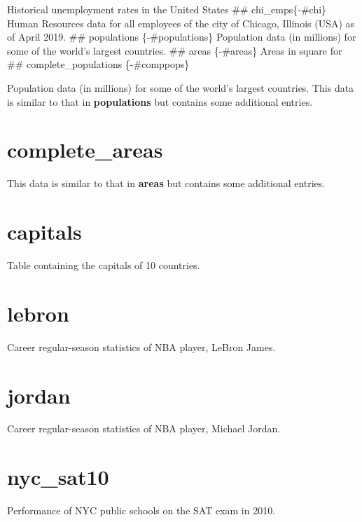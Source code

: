\documentclass[]{book}
\begin{document}
Historical unemployment rates in the United States
\#\# chi\_emps\{-\#chi\}
Human Resources data for all employees of the city of Chicago, Illinois (USA) as of April 2019.
\#\# populations \{-\#populations\}
Population data (in millions) for some of the world's largest countries.
\#\# areas \{-\#areas\}
Areas in square for
\#\# complete\_populations \{-\#comppops\}

Population data (in millions) for some of the world's largest countries. This data is similar to that in \textbf{populations} but contains some additional entries.

\hypertarget{compareas}{%
\section*{complete\_areas}\label{compareas}}

This data is similar to that in \textbf{areas} but contains some additional entries.

\hypertarget{capitals}{%
\section*{capitals}\label{capitals}}

Table containing the capitals of 10 countries.

\hypertarget{lebron}{%
\section*{lebron}\label{lebron}}

Career regular-season statistics of NBA player, LeBron James.

\hypertarget{jordan}{%
\section*{jordan}\label{jordan}}

Career regular-season statistics of NBA player, Michael Jordan.

\hypertarget{nycsat10}{%
\section*{nyc\_sat10}\label{nycsat10}}

Performance of NYC public schools on the SAT exam in 2010.
\end{document}
